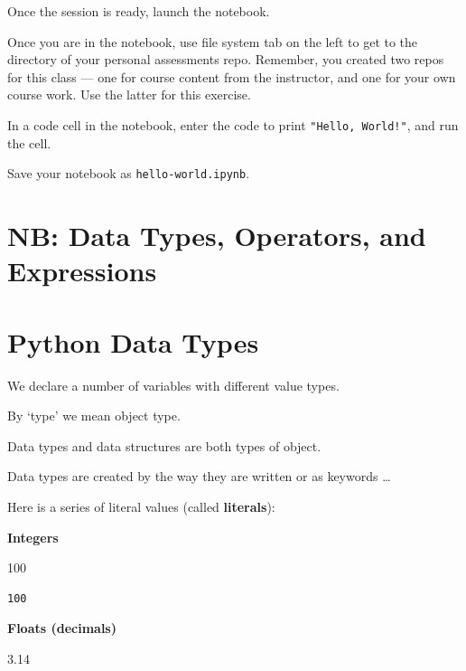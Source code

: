 \documentclass[
  letterpaper,
  DIV=11,
  numbers=noendperiod]{scrreprt}
\newenvironment{Shaded}{\begin{snugshade}}{\end{snugshade}}
\newcommand{\DecValTok}[1]{\textcolor[rgb]{0.68,0.00,0.00}{#1}}
\newcommand{\FloatTok}[1]{\textcolor[rgb]{0.68,0.00,0.00}{#1}}
\begin{document}
Once the session is ready, launch the notebook.

Once you are in the notebook, use file system tab on the left to get to
the directory of your personal assessments repo. Remember, you created
two repos for this class --- one for course content from the instructor,
and one for your own course work. Use the latter for this exercise.

In a code cell in the notebook, enter the code to print
\texttt{"Hello,\ World!"}, and run the cell.

Save your notebook as \texttt{hello-world.ipynb}.

\hypertarget{nb-data-types-operators-and-expressions}{%
\chapter{NB: Data Types, Operators, and
Expressions}\label{nb-data-types-operators-and-expressions}}

\hypertarget{python-data-types}{%
\chapter{Python Data Types}\label{python-data-types}}

We declare a number of variables with different value types.

By `type' we mean object type.

Data types and data structures are both types of object.

Data types are created by the way they are written or as keywords
\ldots{}

Here is a series of literal values (called \textbf{literals}):

\textbf{Integers}

\begin{Shaded}
\begin{Highlighting}[]
\DecValTok{100}
\end{Highlighting}
\end{Shaded}

\begin{verbatim}
100
\end{verbatim}

\textbf{Floats (decimals)}

\begin{Shaded}
\begin{Highlighting}[]
\FloatTok{3.14} 
\end{Highlighting}
\end{Shaded}
\end{document}
